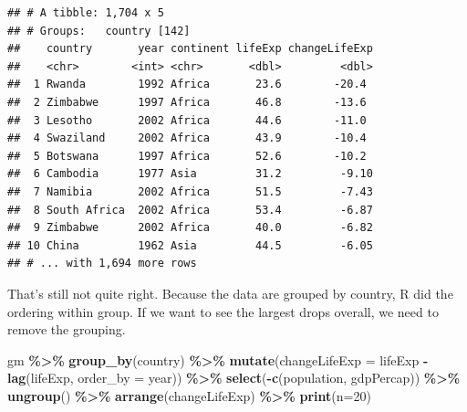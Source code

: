\documentclass[
]{krantz}
\newenvironment{Shaded}{\begin{snugshade}}{\end{snugshade}}
\newcommand{\DataTypeTok}[1]{\textcolor[rgb]{0.13,0.29,0.53}{#1}}
\newcommand{\DecValTok}[1]{\textcolor[rgb]{0.00,0.00,0.81}{#1}}
\newcommand{\KeywordTok}[1]{\textcolor[rgb]{0.13,0.29,0.53}{\textbf{#1}}}
\newcommand{\NormalTok}[1]{#1}
\newcommand{\OperatorTok}[1]{\textcolor[rgb]{0.81,0.36,0.00}{\textbf{#1}}}
\newcommand{\StringTok}[1]{\textcolor[rgb]{0.31,0.60,0.02}{#1}}
\begin{document}
\begin{verbatim}
## # A tibble: 1,704 x 5
## # Groups:   country [142]
##    country       year continent lifeExp changeLifeExp
##    <chr>        <int> <chr>       <dbl>         <dbl>
##  1 Rwanda        1992 Africa       23.6        -20.4 
##  2 Zimbabwe      1997 Africa       46.8        -13.6 
##  3 Lesotho       2002 Africa       44.6        -11.0 
##  4 Swaziland     2002 Africa       43.9        -10.4 
##  5 Botswana      1997 Africa       52.6        -10.2 
##  6 Cambodia      1977 Asia         31.2         -9.10
##  7 Namibia       2002 Africa       51.5         -7.43
##  8 South Africa  2002 Africa       53.4         -6.87
##  9 Zimbabwe      2002 Africa       40.0         -6.82
## 10 China         1962 Asia         44.5         -6.05
## # ... with 1,694 more rows
\end{verbatim}

That's still not quite right. Because the data are grouped by country, R did the ordering within group. If we want to see the largest drops overall, we need to remove the grouping.

\begin{Shaded}
\begin{Highlighting}[]
\NormalTok{gm }\OperatorTok{\%\textgreater{}\%}\StringTok{ }
\StringTok{  }\KeywordTok{group\_by}\NormalTok{(country) }\OperatorTok{\%\textgreater{}\%}\StringTok{ }
\StringTok{  }\KeywordTok{mutate}\NormalTok{(}\DataTypeTok{changeLifeExp =}\NormalTok{ lifeExp }\OperatorTok{{-}}\StringTok{ }\KeywordTok{lag}\NormalTok{(lifeExp, }\DataTypeTok{order\_by =}\NormalTok{ year)) }\OperatorTok{\%\textgreater{}\%}\StringTok{ }
\StringTok{  }\KeywordTok{select}\NormalTok{(}\OperatorTok{{-}}\KeywordTok{c}\NormalTok{(population, gdpPercap)) }\OperatorTok{\%\textgreater{}\%}\StringTok{ }
\StringTok{  }\KeywordTok{ungroup}\NormalTok{() }\OperatorTok{\%\textgreater{}\%}\StringTok{ }
\StringTok{  }\KeywordTok{arrange}\NormalTok{(changeLifeExp) }\OperatorTok{\%\textgreater{}\%}\StringTok{ }
\StringTok{  }\KeywordTok{print}\NormalTok{(}\DataTypeTok{n=}\DecValTok{20}\NormalTok{)}
\end{Highlighting}
\end{Shaded}
\end{document}
